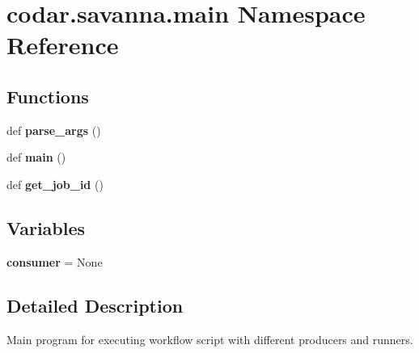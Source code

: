 \hypertarget{namespacecodar_1_1savanna_1_1main}{}\section{codar.\+savanna.\+main Namespace Reference}
\label{namespacecodar_1_1savanna_1_1main}
\subsection*{Functions}
\begin{DoxyCompactItemize}
\item 
\mbox{\label{namespacecodar_1_1savanna_1_1main_a09ab91d19cb193d6d01e65d3f415ec22}} 
def {\bfseries parse\+\_\+args} ()
\item 
\mbox{\label{namespacecodar_1_1savanna_1_1main_ab5690a0c0dfa679e7b43175a365b5a81}} 
def {\bfseries main} ()
\item 
\mbox{\label{namespacecodar_1_1savanna_1_1main_a744cfd54425208a09aa9aa31c4bce655}} 
def {\bfseries get\+\_\+job\+\_\+id} ()
\end{DoxyCompactItemize}
\subsection*{Variables}
\begin{DoxyCompactItemize}
\item 
\mbox{\label{namespacecodar_1_1savanna_1_1main_a12ce430b046def16041cbc8435c43dbc}} 
{\bfseries consumer} = None
\end{DoxyCompactItemize}


\subsection{Detailed Description}
\begin{DoxyVerb}Main program for executing workflow script with different producers and
runners.\end{DoxyVerb}
 